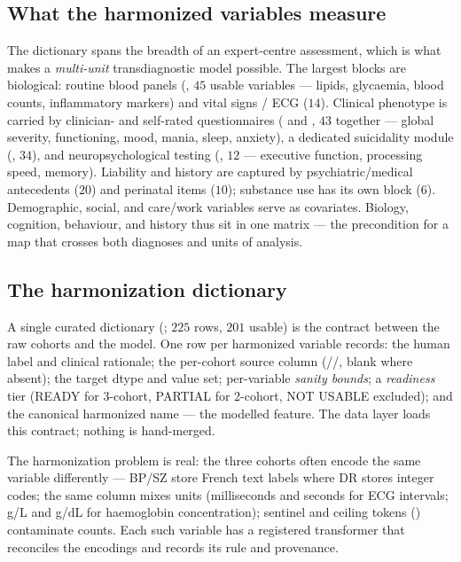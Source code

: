 \subsection{What the harmonized variables measure}
The dictionary spans the breadth of an expert-centre assessment, which is what makes a \emph{multi-unit}
transdiagnostic model possible. The largest blocks are biological: routine blood panels (, $45$ usable variables --- lipids, glycaemia, blood counts, inflammatory markers) and vital
signs / ECG ($14$). Clinical phenotype is carried by clinician- and self-rated questionnaires
( and , $43$ together --- global severity, functioning, mood, mania,
sleep, anxiety), a dedicated suicidality module (, $34$), and neuropsychological testing
(, $12$ --- executive function, processing speed, memory). Liability and history are
captured by psychiatric/medical antecedents ($20$) and perinatal items ($10$); substance use has its own
block ($6$). Demographic, social, and care/work variables serve as covariates. Biology, cognition,
behaviour, and history thus sit in one matrix --- the precondition for a map that crosses both diagnoses and
units of analysis.

\subsection{The harmonization dictionary}
A single curated dictionary (; $225$ rows, $201$ usable) is the contract
between the raw cohorts and the model. One row per harmonized variable records: the human label and clinical
rationale; the per-cohort source column (//, blank where absent); the target dtype
and value set; per-variable \emph{sanity bounds}; a \emph{readiness} tier (READY for 3-cohort, PARTIAL for
2-cohort, NOT USABLE excluded); and the canonical harmonized name --- the modelled feature. The data layer
loads this contract; nothing is hand-merged.

The harmonization problem is real: the three cohorts often encode the same variable differently --- BP/SZ store
French text labels where DR stores integer codes; the same column mixes units (milliseconds and seconds for ECG
intervals; g/L and g/dL for haemoglobin concentration); sentinel and ceiling tokens () contaminate
counts. Each such variable has a registered transformer that reconciles the encodings and records its rule and
provenance.

